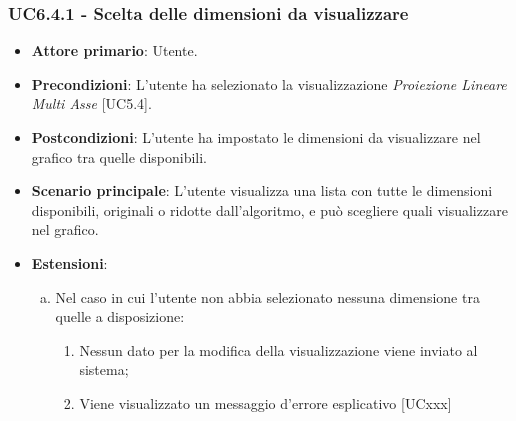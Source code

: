 \subsubsection{UC6.4.1 - Scelta delle dimensioni da visualizzare}
\begin{itemize}
	\item \textbf{Attore primario}: Utente.
	\item \textbf{Precondizioni}: L'utente ha selezionato la visualizzazione \textit{Proiezione Lineare Multi Asse} [UC5.4].
	\item \textbf{Postcondizioni}: L'utente ha impostato le dimensioni da visualizzare nel grafico tra quelle disponibili.
	
	\item \textbf{Scenario principale}: L'utente visualizza una lista con tutte le dimensioni disponibili, originali o ridotte dall'algoritmo, e può scegliere quali visualizzare nel grafico.
	
	\item \textbf{Estensioni}:
	\begin{enumerate}[(a)]
		\item Nel caso in cui l'utente non abbia selezionato nessuna dimensione tra quelle a disposizione:
		\begin{enumerate}[1.]
			\item Nessun dato per la modifica della visualizzazione viene inviato al sistema;
			\item Viene visualizzato un messaggio d'errore esplicativo [UCxxx]
		\end{enumerate}
	\end{enumerate}
\end{itemize}